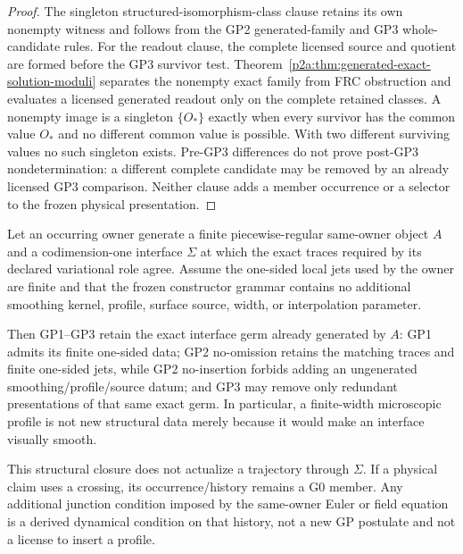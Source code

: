 \documentclass[12pt,a4paper]{article}
\begin{document}
\begin{proof}
The singleton structured-isomorphism-class clause retains its own
nonempty witness and follows from the GP2 generated-family and GP3
whole-candidate rules.  For the readout clause, the complete licensed source
and quotient are formed before the GP3 survivor test.  Theorem~\ref{p2a:thm:generated-exact-solution-moduli}
separates the nonempty exact family from FRC obstruction and evaluates a
licensed generated readout only on the complete retained classes.  A nonempty
image is a singleton $\{O_*\}$ exactly when every survivor has the common
value $O_*$ and no different common value is possible.  With two different
surviving values no such singleton exists.  Pre-GP3 differences do not prove
post-GP3 nondetermination: a different complete candidate may be removed by
an already licensed GP3 comparison.  Neither clause adds a member occurrence
or a selector to the frozen physical presentation.
\end{proof}

\begin{corollary}
\label{p2a:cor:generated-exact-interface-closure}
Let an occurring owner generate a finite piecewise-regular same-owner object
\(A\) and a codimension-one interface \(\Sigma\) at which the exact traces
required by its declared variational role agree.  Assume the one-sided local
jets used by the owner are finite and that the frozen constructor grammar
contains no additional smoothing kernel, profile, surface source, width,
or interpolation parameter.

Then GP1--GP3 retain the exact interface germ already generated by \(A\):
GP1 admits its finite one-sided data; GP2 no-omission retains the matching
traces and finite one-sided jets, while GP2 no-insertion forbids adding an
ungenerated smoothing/profile/source datum; and GP3 may remove only redundant
presentations of that same exact germ.  In particular, a finite-width
microscopic profile is not new structural data merely because it would make
an interface visually smooth.

This structural closure does not actualize a trajectory through \(\Sigma\).
If a physical claim uses a crossing, its occurrence/history remains a G0
member.  Any additional junction condition imposed by the same-owner Euler
or field equation is a derived dynamical condition on that history, not a new
GP postulate and not a license to insert a profile.
\end{corollary}
\end{document}
